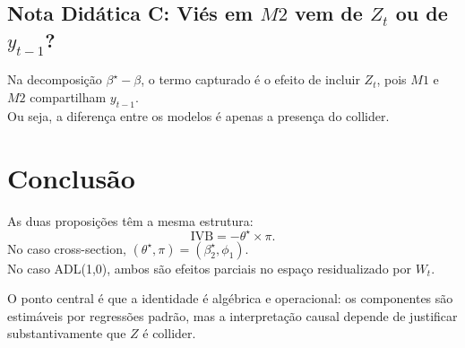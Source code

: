 \documentclass[
]{article}
\begin{document}
\subsection{\texorpdfstring{Nota Didática C: Viés em \(M2\) vem de
\(Z_t\) ou de
\(y_{t-1}\)?}{Nota Didática C: Viés em M2 vem de Z\_t ou de y\_\{t-1\}?}}\label{nota-diduxe1tica-c-viuxe9s-em-m2-vem-de-z_t-ou-de-y_t-1}

Na decomposição \(\beta^\star-\beta\), o termo capturado é o efeito de
incluir \(Z_t\), pois \(M1\) e \(M2\) compartilham \(y_{t-1}\).\\
Ou seja, a diferença entre os modelos é apenas a presença do collider.

\section{Conclusão}\label{conclusuxe3o}

As duas proposições têm a mesma estrutura: \[
\text{IVB}=-\theta^\star\times\pi.
\] No caso cross-section,
\((\theta^\star,\pi)=(\beta_2^\star,\phi_1)\).\\
No caso ADL(1,0), ambos são efeitos parciais no espaço residualizado por
\(W_t\).

O ponto central é que a identidade é algébrica e operacional: os
componentes são estimáveis por regressões padrão, mas a interpretação
causal depende de justificar substantivamente que \(Z\) é collider.
\end{document}
